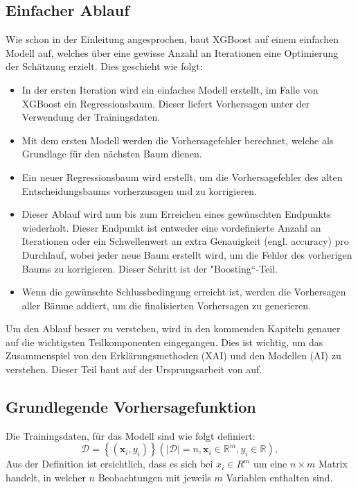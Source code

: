\documentclass[12pt,titlepage,oneside]{book}
\begin{document}
\subsection{Einfacher Ablauf} \label{xgboostEinfacherAblauf}
Wie schon in der Einleitung angesprochen, baut XGBoost auf einem einfachen Modell auf, welches über eine gewisse Anzahl an Iterationen eine Optimierung der Schätzung erzielt. Dies geschieht wie folgt:
\begin{itemize}
    \item In der ersten Iteration wird ein einfaches Modell erstellt, im Falle von XGBoost ein Regressionsbaum. Dieser liefert Vorhersagen unter der Verwendung der Trainingsdaten.
    \item Mit dem ersten Modell werden die Vorhersagefehler berechnet, welche als Grundlage für den nächsten Baum dienen.
    \item Ein neuer Regressionsbaum wird erstellt, um die Vorhersagefehler des alten Entscheidungsbaums vorherzusagen und zu korrigieren.
    \item Dieser Ablauf wird nun bis zum Erreichen eines gewünschten Endpunkts wiederholt. Dieser Endpunkt ist entweder eine vordefinierte Anzahl an Iterationen oder ein Schwellenwert an extra Genauigkeit (engl. accuracy) pro Durchlauf, wobei jeder neue Baum erstellt wird, um die Fehler des vorherigen Baums zu korrigieren. Dieser Schritt ist der "Boosting“-Teil.
    \item Wenn die gewünschte Schlussbedingung erreicht ist, werden die Vorhersagen aller Bäume addiert, um die finalisierten Vorhersagen zu generieren.
\end{itemize}

Um den Ablauf besser zu verstehen, wird in den kommenden Kapiteln genauer auf die wichtigsten Teilkomponenten eingegangen. Dies ist wichtig, um das Zusammenspiel von den Erklärungsmethoden (XAI) und den Modellen (AI) zu verstehen. Dieser Teil baut auf der Ursprungsarbeit von \cite{chen2016xgboost} auf.

\subsection{Grundlegende Vorhersagefunktion} \label{xgboostGrundlegendeVorhersagefunktion}
Die Trainingsdaten, für das Modell sind wie folgt definiert:
\begin{equation}
    \mathcal{D}=\left\{\left(\mathbf{x}_i, y_i\right)\right\}\left(|\mathcal{D}|=n, \mathbf{x}_i \in \mathbb{R}^m, y_i \in \mathbb{R}\right),
\end{equation}
Aus der Definition ist ersichtlich, dass es sich bei $x_i \in R^m$ um eine $n \times m$ Matrix handelt, in welcher $n$ Beobachtungen mit jeweils $m$ Variablen enthalten sind.\\
\end{document}
